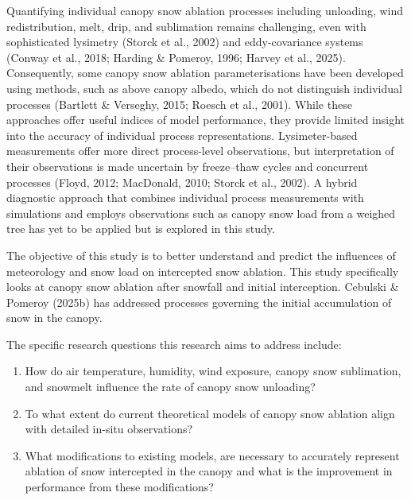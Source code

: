 \documentclass[
  letterpaper,
]{tex/uofsthesis-cs}
\begin{document}
Quantifying individual canopy snow ablation processes including
unloading, wind redistribution, melt, drip, and sublimation remains
challenging, even with sophisticated lysimetry (Storck et al., 2002) and
eddy-covariance systems (Conway et al., 2018; Harding \& Pomeroy, 1996;
Harvey et al., 2025). Consequently, some canopy snow ablation
parameterisations have been developed using methods, such as above
canopy albedo, which do not distinguish individual processes (Bartlett
\& Verseghy, 2015; Roesch et al., 2001). While these approaches offer
useful indices of model performance, they provide limited insight into
the accuracy of individual process representations. Lysimeter-based
measurements offer more direct process-level observations, but
interpretation of their observations is made uncertain by freeze--thaw
cycles and concurrent processes (Floyd, 2012; MacDonald, 2010; Storck et
al., 2002). A hybrid diagnostic approach that combines individual
process measurements with simulations and employs observations such as
canopy snow load from a weighed tree has yet to be applied but is
explored in this study.

The objective of this study is to better understand and predict the
influences of meteorology and snow load on intercepted snow ablation.
This study specifically looks at canopy snow ablation after snowfall and
initial interception. Cebulski \& Pomeroy (2025b) has addressed
processes governing the initial accumulation of snow in the canopy.

The specific research questions this research aims to address include:

\begin{enumerate}
\def\labelenumi{\arabic{enumi}.}
\item
  How do air temperature, humidity, wind exposure, canopy snow
  sublimation, and snowmelt influence the rate of canopy snow unloading?
\item
  To what extent do current theoretical models of canopy snow ablation
  align with detailed in-situ observations?
\item
  What modifications to existing models, are necessary to accurately
  represent ablation of snow intercepted in the canopy and what is the
  improvement in performance from these modifications?
\end{enumerate}
\end{document}
